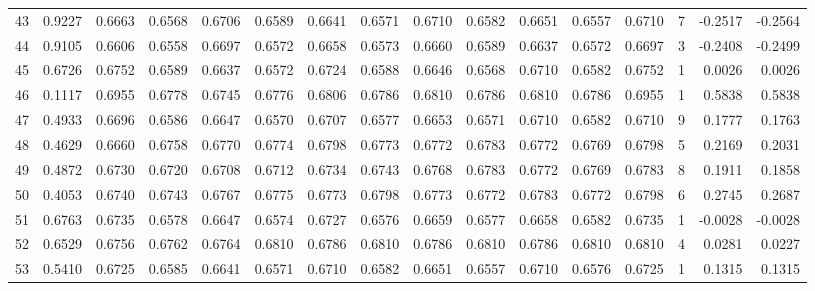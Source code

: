 \begin{tabular}{lrrrrrrrrrrrrrrr}
43  &      0.9227 &  0.6663 &  0.6568 &  0.6706 &  0.6589 &  0.6641 &  0.6571 &  0.6710 &  0.6582 &  0.6651 &   0.6557 &     0.6710 &      7 &                   -0.2517 &                    -0.2564 \\
44  &      0.9105 &  0.6606 &  0.6558 &  0.6697 &  0.6572 &  0.6658 &  0.6573 &  0.6660 &  0.6589 &  0.6637 &   0.6572 &     0.6697 &      3 &                   -0.2408 &                    -0.2499 \\
45  &      0.6726 &  0.6752 &  0.6589 &  0.6637 &  0.6572 &  0.6724 &  0.6588 &  0.6646 &  0.6568 &  0.6710 &   0.6582 &     0.6752 &      1 &                    0.0026 &                     0.0026 \\
46  &      0.1117 &  0.6955 &  0.6778 &  0.6745 &  0.6776 &  0.6806 &  0.6786 &  0.6810 &  0.6786 &  0.6810 &   0.6786 &     0.6955 &      1 &                    0.5838 &                     0.5838 \\
47  &      0.4933 &  0.6696 &  0.6586 &  0.6647 &  0.6570 &  0.6707 &  0.6577 &  0.6653 &  0.6571 &  0.6710 &   0.6582 &     0.6710 &      9 &                    0.1777 &                     0.1763 \\
48  &      0.4629 &  0.6660 &  0.6758 &  0.6770 &  0.6774 &  0.6798 &  0.6773 &  0.6772 &  0.6783 &  0.6772 &   0.6769 &     0.6798 &      5 &                    0.2169 &                     0.2031 \\
49  &      0.4872 &  0.6730 &  0.6720 &  0.6708 &  0.6712 &  0.6734 &  0.6743 &  0.6768 &  0.6783 &  0.6772 &   0.6769 &     0.6783 &      8 &                    0.1911 &                     0.1858 \\
50  &      0.4053 &  0.6740 &  0.6743 &  0.6767 &  0.6775 &  0.6773 &  0.6798 &  0.6773 &  0.6772 &  0.6783 &   0.6772 &     0.6798 &      6 &                    0.2745 &                     0.2687 \\
51  &      0.6763 &  0.6735 &  0.6578 &  0.6647 &  0.6574 &  0.6727 &  0.6576 &  0.6659 &  0.6577 &  0.6658 &   0.6582 &     0.6735 &      1 &                   -0.0028 &                    -0.0028 \\
52  &      0.6529 &  0.6756 &  0.6762 &  0.6764 &  0.6810 &  0.6786 &  0.6810 &  0.6786 &  0.6810 &  0.6786 &   0.6810 &     0.6810 &      4 &                    0.0281 &                     0.0227 \\
53  &      0.5410 &  0.6725 &  0.6585 &  0.6641 &  0.6571 &  0.6710 &  0.6582 &  0.6651 &  0.6557 &  0.6710 &   0.6576 &     0.6725 &      1 &                    0.1315 &                     0.1315 \\

\end{tabular}
